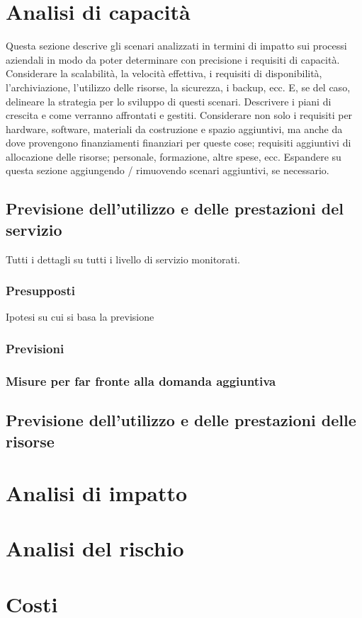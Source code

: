 \newpage
\section{Analisi di capacità}
Questa sezione descrive gli scenari analizzati in termini di impatto sui processi aziendali in modo da poter determinare con precisione i requisiti di capacità. Considerare la scalabilità, la velocità effettiva, i requisiti di disponibilità, l'archiviazione, l'utilizzo delle risorse, la sicurezza, i backup, ecc. E, se del caso, delineare la strategia per lo sviluppo di questi scenari.
Descrivere i piani di crescita e come verranno affrontati e gestiti. Considerare non solo i requisiti per hardware, software, materiali da costruzione e spazio aggiuntivi, ma anche da dove provengono finanziamenti finanziari per queste cose; requisiti aggiuntivi di allocazione delle risorse; personale, formazione, altre spese, ecc. Espandere su questa sezione aggiungendo / rimuovendo scenari aggiuntivi, se necessario.

\subsection{Previsione dell'utilizzo e delle prestazioni del servizio}
	Tutti i dettagli su tutti i livello di servizio monitorati.
	
	\subsubsection{Presupposti}
	Ipotesi su cui si basa la previsione 
	\subsubsection{Previsioni}
	\subsubsection{Misure per far fronte alla domanda aggiuntiva}
	
	
\subsection{Previsione dell'utilizzo e delle prestazioni delle risorse}



\newpage
\section{Analisi di impatto}


\newpage
\section{Analisi del rischio}

\newpage
\section{Costi}